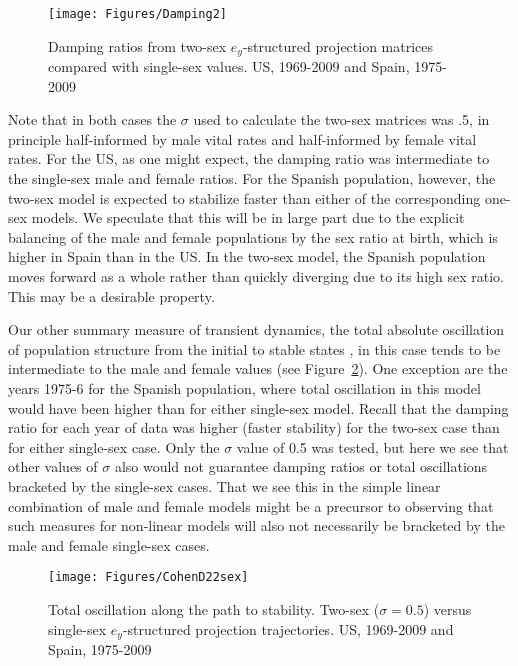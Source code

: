 \begin{figure}[ht!]
        \centering  
          \caption{Damping ratios from two-sex $e_y$-structured projection
          matrices compared with single-sex values. US, 1969-2009 and Spain,
          1975-2009}
           \texttt{[image: Figures/Damping2]}
          \label{fig:damping2}
\end{figure}
Note that in both cases the $\sigma$ used to calculate the two-sex matrices was
.5, in principle half-informed by male vital rates and half-informed by female vital rates. For the US, as one might expect, the damping
ratio was intermediate to the single-sex male and female ratios. For
the Spanish population, however, the two-sex model is expected to stabilize
faster than either of the corresponding one-sex models. We speculate that this
will be in large part due to the explicit balancing of the male and female
populations by the sex ratio at birth, which is higher in Spain than in the US. 
In the two-sex model, the Spanish population moves forward as a whole rather 
than quickly diverging due to its high sex ratio. This may be a desirable
property.

Our other summary measure of transient dynamics, the total absolute
oscillation of population structure from the initial to stable states
\citep{cohen1979cumulative}, in this case tends to be intermediate to the male
and female values (see Figure~\ref{fig:cohend22sex}). One exception are the
years 1975-6 for the Spanish population, where total oscillation in this model
would have been higher than for either single-sex model. Recall that the damping
ratio for each year of data was higher (faster stability) for the two-sex case 
than for either single-sex case. Only the $\sigma$ value of 0.5 was tested, but
here we see that other values of $\sigma$ also would not guarantee damping ratios or
total oscillations bracketed by the single-sex cases. That we see this in the
simple linear combination of male and female models might be a precursor to
observing that such measures for non-linear models will also not necessarily be
bracketed by the male and female single-sex cases.

\begin{figure}[ht!]
        \centering  
          \caption{Total oscillation along the path to
       stability. Two-sex ($\sigma = 0.5$) versus single-sex $e_y$-structured
       projection trajectories. US, 1969-2009 and Spain, 1975-2009}
           \texttt{[image: Figures/CohenD22sex]}
          \label{fig:cohend22sex}
\end{figure}
 \FloatBarrier





